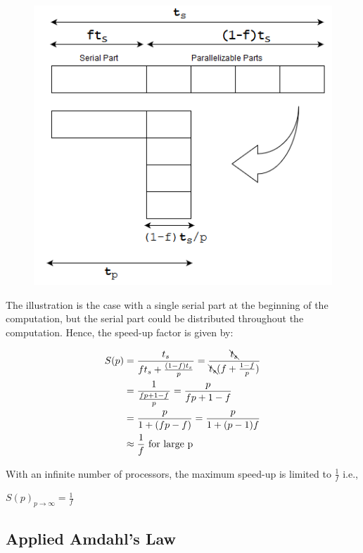 \documentclass[a4paper]{article}
\begin{document}
\begin{figure}[h]
\label{fig:ap2}
\includegraphics[scale=0.9]{alternate_representation.png}
\centering
\end{figure}

\pagebreak

\noindent
The illustration is the case with a single serial part at the beginning of the computation, but the serial part could be distributed throughout the computation. Hence, the speed-up factor is given by:

\begin{Large}
\begin{align*}
S(p) &= \frac{t_s}{ft_s + \frac{(1 - f)t_s}{p}} 
= \frac{\bcancel{t_s}}{\bcancel{t_s}(f + \frac{1 - f}{p})} \\
&= \frac{1}{\frac{fp + 1 - f}{p}} 
= \frac{p}{fp + 1 - f} \\
&= \frac{p}{1 + (fp - f)} 
= \frac{p}{1 + (p - 1)f} \\
&\approx \frac{1}{f} \text{ for large p}
\end{align*}
\end{Large}

\noindent
With an infinite number of processors, the maximum speed-up is limited to {\Large $\frac{1}{f}$} i.e.,
\begin{center}
{\Large $S(p)_{p \to \infty} = \frac{1}{f}$}
\end{center}

\subsection{Applied Amdahl's Law}
\end{document}
